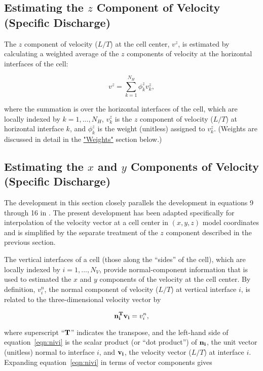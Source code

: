 \subsection{Estimating the $z$ Component of Velocity (Specific Discharge)}

The $z$ component of velocity ($L/T$) at the cell center, $v^z$, is estimated by calculating a weighted average of the $z$ components of velocity at the horizontal interfaces of the cell:

\begin{equation}
\label{eqn:vz}
v^z = \sum_{k=1}^{N_H} \phi_k^z v_k^z,
\end{equation}

\noindent where the summation is over the horizontal interfaces of the cell, which are locally indexed by $k = 1, ..., N_H$, $v_k^z$ is the $z$ component of velocity ($L/T$) at horizontal interface $k$, and $\phi_k^z$ is the weight (unitless) assigned to $v_k^z$. (Weights are discussed in detail in the \hyperref[sec:weights]{"Weights"} section below.)

\subsection{Estimating the $x$ and $y$ Components of Velocity (Specific Discharge)}

The development in this section closely parallels the development in equations 9 through 16 in \cite{modflow6xt3d}. The present development has been adapted specifically for interpolation of the velocity vector at a cell center in $\left( x, y, z \right)$ model coordinates and is simplified by the separate treatment of the $z$ component described in the previous section.

The vertical interfaces of a cell (those along the ``sides'' of the cell), which are locally indexed by $i = 1, ..., N_V$, provide normal-component information that is used to estimated the $x$ and $y$ components of the velocity at the cell center. By definition, $v_i^n$, the normal component of velocity ($L/T$) at vertical interface $i$, is related to the three-dimensional velocity vector by

\begin{equation}
\label{eqn:nivi}
\mathbf{n_i^T} \mathbf{v_i} = v_i^n,
\end{equation}

\noindent where superscript ``$\mathbf{T}$'' indicates the transpose, and the left-hand side of equation~\ref{eqn:nivi} is the scalar product (or ``dot product'') of $\mathbf{n_i}$, the unit vector (unitless) normal to interface $i$, and $\mathbf{v_i}$, the velocity vector ($L/T$) at interface $i$. Expanding equation~\ref{eqn:nivi} in terms of vector components gives

